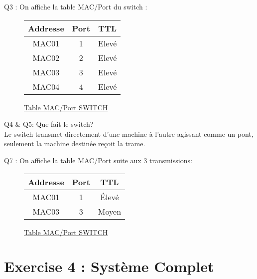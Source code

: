 \documentclass[11pt]{book}
\begin{document}
        \begin{dent}{Q3 :} On affiche la table MAC/Port du switch :
            \begin{figure}[ht]
                \centering
                \begin{tabular}{c|c|c}
                    Addresse & Port & TTL\\
                    \hline
                    MAC01 & 1 & Elevé \\
                    \hline
                    MAC02 & 2 & Elevé \\
                    \hline
                    MAC03 & 3 & Elevé \\
                    \hline
                    MAC04 & 4 & Elevé \\
                \end{tabular}
                \caption{\ul{Table MAC/Port SWITCH}}
            \end{figure}
         \end{dent}
        
         \begin{dent}{Q4 \& Q5:} Que fait le switch?\\
            Le switch transmet directement d'une machine à l'autre agissant comme un pont, seulement la machine destinée reçoit la trame.
             
          \end{dent}
         

        \begin{dent}{Q7 :} On affiche la table MAC/Port suite aux 3 transmissions:
            \begin{figure}[ht]
                \centering
                \begin{tabular}{c|c|c}
                    Addresse & Port & TTL\\
                    \hline
                    MAC01 & 1 & Élevé \\
                    \hline
                    MAC03 & 3 & Moyen \\
                \end{tabular}
                \caption{\ul{Table MAC/Port SWITCH}}
            \end{figure}
         \end{dent}
        
	\section{Exercise 4 : Système Complet}
\end{document}
